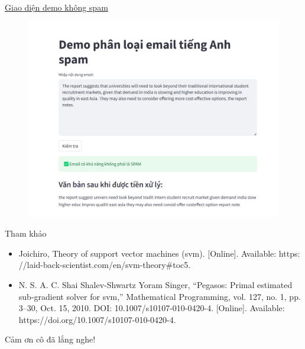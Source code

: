 \documentclass[serif, aspectratio=169]{beamer}
\begin{document}
	\begin{frame}{\href{https://ai-svm-deploy.onrender.com}{Giao diện demo không spam}}
		\begin{figure}
			\centering
			\includegraphics[width=0.6\linewidth]{pic/demo-not-spam.png}
			\label{fig:demo-not-spam}
		\end{figure}
	\end{frame}
	\begin{frame}{Tham khảo}
		\begin{itemize}
			\item Joichiro, Theory of support vector machines (svm). [Online]. Available: https:
			//laid-back-scientist.com/en/svm-theory#toc5.
			\item N. S. A. C. Shai Shalev-Shwartz Yoram Singer, “Pegasos: Primal estimated
			sub-gradient solver for svm,” Mathematical Programming, vol. 127, no. 1,
			pp. 3–30, Oct. 15, 2010. DOI: 10.1007/s10107-010-0420-4. [Online].
			Available: https://doi.org/10.1007/s10107-010-0420-4.
		\end{itemize}
	\end{frame}
	
	\begin{frame}
		\begin{center}
			{ Cảm ơn cô đã lắng nghe!}
			\vspace{1cm}
			
		\end{center}
	\end{frame}
	
\end{document}
